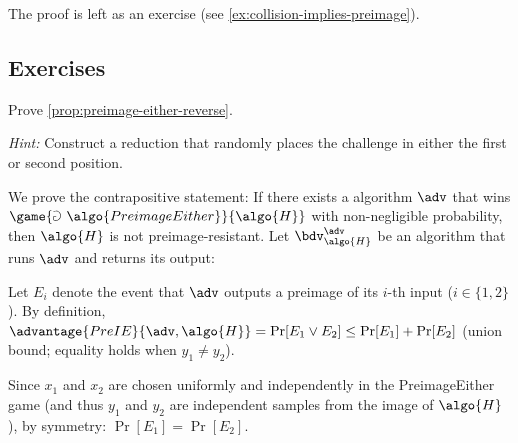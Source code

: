 The proof is left as an exercise (see \autoref{ex:collision-implies-preimage}).

\subsection{Exercises}

\begin{exercise}\label{ex:preimage-either-reverse}
  Prove \autoref{prop:preimage-either-reverse}.
  
  \emph{Hint:} Construct a reduction that randomly places the challenge in either the first or second position.
\end{exercise}

\ifsolutions
\begin{mysolution}
  We prove the contrapositive statement:
  If there exists a \ppt algorithm $\adv$ that wins $\game{\Game~\algo{PreimageEither}}{\algo{H}}$ with non-negligible probability, then $\algo{H}$ is not preimage-resistant.
  Let $\bdv^\adv_\algo{H}$ be an algorithm that runs $\adv$ and returns its output:

  \begin{center}
    \begin{tcolorbox}[width=6cm]
      \begin{pchstack}[center]
      \end{pchstack}
    \end{tcolorbox}
  \end{center}
  
  Let $E_i$ denote the event that $\adv$ outputs a preimage of its $i$-th input ($i \in \{1, 2\}$).
  By definition, $\advantage{PreIE}{\adv, \algo{H}} = \Pr[E_1 \vee E_2] \leq \Pr[E_1] + \Pr[E_2]$ (union bound; equality holds when $y_1 \neq y_2$).
  
  Since $x_1$ and $x_2$ are chosen uniformly and independently in the PreimageEither game (and thus $y_1$ and $y_2$ are independent samples from the image of $\algo{H}$), by symmetry: $\Pr[E_1] = \Pr[E_2]$.
  

\end{mysolution}
